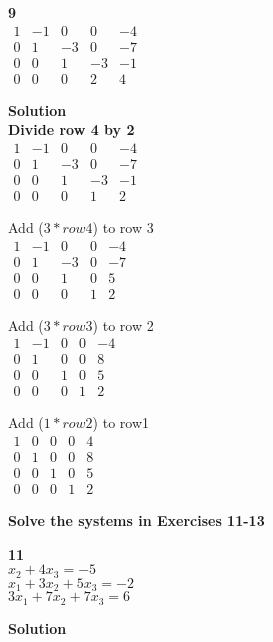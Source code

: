 \documentclass{article}
\begin{document}
\bf{9}\\
$
\begin{matrix}
1 & -1 & 0 & 0 & -4\\
0 & 1 & -3 & 0 & -7\\
0 & 0 & 1 & -3 & -1\\
0 & 0 & 0 & 2 & 4
\end{matrix}
$

\bf{Solution}\\
Divide row 4 by 2\\
$
\begin{matrix}
1 & -1 & 0 & 0 & -4\\
0 & 1 & -3 & 0 & -7\\
0 & 0 & 1 & -3 & -1\\
0 & 0 & 0 & 1 & 2
\end{matrix}
$

Add ($3*row4$) to row 3\\
$
\begin{matrix}
1 & -1 & 0 & 0 & -4\\
0 & 1 & -3 & 0 & -7\\
0 & 0 & 1 & 0 & 5\\
0 & 0 & 0 & 1 & 2
\end{matrix}
$

Add ($3*row3$) to row 2\\
$
\begin{matrix}
1 & -1 & 0 & 0 & -4\\
0 & 1 & 0 & 0 & 8\\
0 & 0 & 1 & 0 & 5\\
0 & 0 & 0 & 1 & 2
\end{matrix}
$

Add ($1*row2$) to row1\\
$
\begin{matrix}
1 & 0 & 0 & 0 & 4\\
0 & 1 & 0 & 0 & 8\\
0 & 0 & 1 & 0 & 5\\
0 & 0 & 0 & 1 & 2
\end{matrix}
$

\bf{Solve the systems in Exercises 11-13}

\bf{11}\\
$x_{2} + 4x_{3} = -5$\\
$x_{1} + 3x_{2} + 5x_{3} = -2$\\
$3x_{1} + 7x_{2} + 7x_{3} = 6$

\bf{Solution}\\
\end{document}
